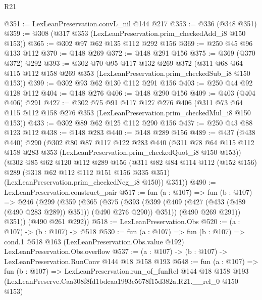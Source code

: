 \begin{lexlean}{R21}
\begin{coremodule}
@351 := LexLeanPreservation.convL_nil @144 @217
@353 := @336 (@348 @351)
@359 := @308 (@317 @353 (LexLeanPreservation.prim_checkedAdd_i8 @150 @153))
@365 := @302 @97 @62 @135 @112 @292 @156
@369 := @250 @45 @96 @133 @112
@370 := @148 @269
@372 := @148 @291 @156
@375 := @369 (@370 @372) @292
@393 := @302
    @70
    @95
    @117
    @132
    @269
    @372
    (@311 @68 @64 @115 @112 @158 @269 @353 (LexLeanPreservation.prim_checkedSub_i8 @150 @153))
@399 := @302 @93 @62 @130 @112 @291 @156
@403 := @250 @44 @92 @128 @112
@404 := @148 @276
@406 := @148 @290 @156
@409 := @403 (@404 @406) @291
@427 := @302
    @75
    @91
    @117
    @127
    @276
    @406
    (@311 @73 @64 @115 @112 @158 @276 @353 (LexLeanPreservation.prim_checkedMul_i8 @150 @153))
@433 := @302 @89 @62 @125 @112 @290 @156
@437 := @250 @43 @88 @123 @112
@438 := @148 @283
@440 := @148 @289 @156
@489 := @437
    (@438 @440)
    @290
    (@302
      @80
      @87
      @117
      @122
      @283
      @440
      (@311 @78 @64 @115 @112 @158 @283 @353 (LexLeanPreservation.prim_checkedQuot_i8 @150 @153))
      (@302
        @85
        @62
        @120
        @112
        @289
        @156
        (@311
          @82
          @84
          @114
          @112
          (@152 @156)
          @289
          (@318 @62 @112 @112 @151 @156 @335 @351)
          (LexLeanPreservation.prim_checkedNeg_i8 @150))
        @351))
@490 := LexLeanPreservation.construct_pair
@517 := fun (a : @107) =>
  fun (b : @107) =>
  @246
    (@299
      (@359
        (@365
          (@375
            (@393 (@399 (@409 (@427 (@433 (@489 (@490 @283 @289)) @351)) (@490 @276 @290)) @351))
            (@490 @269 @291))
          @351))
      (@490 @261 @292))
@518 := LexLeanPreservation.Obs
@520 := (a : @107) -> (b : @107) -> @518
@530 := fun (a : @107) =>
  fun (b : @107) =>
  cond.{1} @518 @163 (LexLeanPreservation.Obs.value @192) LexLeanPreservation.Obs.overflow
@537 := (a : @107) -> (b : @107) -> LexLeanPreservation.RunConv @144 @18 @158 @193
@548 := fun (a : @107) =>
  fun (b : @107) =>
  LexLeanPreservation.run_of_funRel
    @144
    @18
    @158
    @193
    (LexLeanPreserve.Caa308f8fd1bdcaa1993c5678f15d382a.R21.__rel_0 @150 @153)
\end{coremodule}
\end{lexlean}
